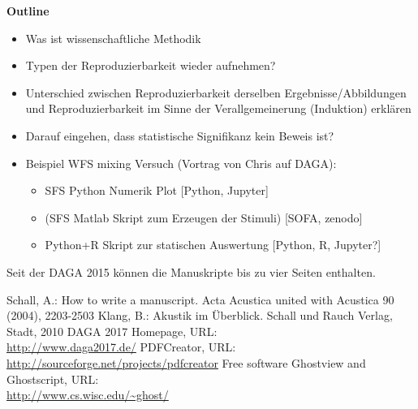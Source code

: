 \documentclass[a4paper, 10pt, twocolumn]{article}
\begin{document}
\textbf{Outline}
\begin{itemize}
    \item Was ist wissenschaftliche Methodik
    \item Typen der Reproduzierbarkeit wieder aufnehmen?
    \item Unterschied zwischen Reproduzierbarkeit derselben
        Ergebnisse/Abbildungen und Reproduzierbarkeit im Sinne der
        Verallgemeinerung (Induktion) erklären
    \item Darauf eingehen, dass statistische Signifikanz kein Beweis ist?
    \item Beispiel WFS mixing Versuch (Vortrag von Chris auf DAGA):
        \begin{itemize}
            \item SFS Python Numerik Plot [Python, Jupyter]
            \item (SFS Matlab Skript zum Erzeugen der Stimuli) [SOFA, zenodo]
            \item Python+R Skript zur statischen Auswertung [Python, R,
                Jupyter?]
        \end{itemize}
\end{itemize}

Seit der DAGA 2015 können die Manuskripte bis zu vier Seiten enthalten.


\begin{thebibliography}{5}
Schall, A.: How to write a manuscript. Acta Acustica united with
Acustica 90 (2004), 2203-2503
Klang, B.: Akustik im Überblick. Schall und Rauch Verlag, Stadt,
2010
DAGA 2017 Homepage, URL:\\
\url{http://www.daga2017.de/}
PDFCreator, URL:\\
\url{http://sourceforge.net/projects/pdfcreator}
Free software Ghostview and Ghostscript, URL:\\
\url{http://www.cs.wisc.edu/~ghost/}
\end{thebibliography}
\end{document}
